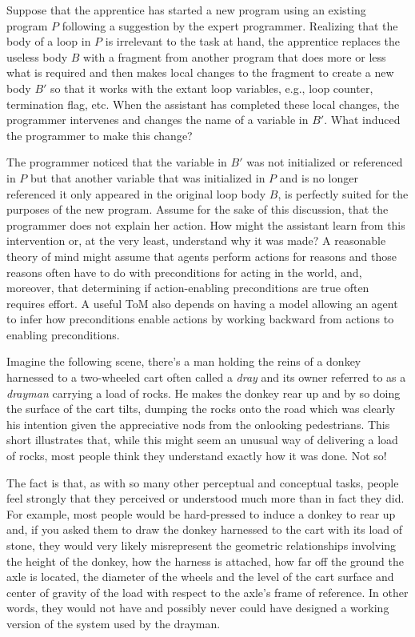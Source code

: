 Suppose that the apprentice has started a new program using an existing program $P$ following a suggestion by the expert programmer. Realizing that the body of a loop in $P$ is irrelevant to the task at hand, the apprentice replaces the useless body $B$ with a fragment from another program that does more or less what is required and then makes local changes to the fragment to create a new body $B'$ so that it works with the extant loop variables, e.g., loop counter, termination flag, etc. When the assistant has completed these local changes, the programmer intervenes and changes the name of a variable in $B'$. What induced the programmer to make this change?

The programmer noticed that the variable in $B'$ was not initialized or referenced in $P$ but that another variable that was initialized in $P$ and is no longer referenced \emdash{} it only appeared in the original loop body $B$, is perfectly suited for the purposes of the new program. Assume for the sake of this discussion, that the programmer does not explain her action. How might the assistant learn from this intervention or, at the very least, understand why it was made? A reasonable theory of mind might assume that agents perform actions for reasons and those reasons often have to do with preconditions for acting in the world, and, moreover, that determining if action-enabling preconditions are true often requires effort. A useful ToM also depends on having a model allowing an agent to infer how preconditions enable actions by working backward from actions to enabling preconditions. 


Imagine the following scene, there's a man holding the reins of a donkey harnessed to a two-wheeled cart \emdash{} often called a {\it{dray}} and its owner referred to as a {\it{drayman}} \emdash{} carrying a load of rocks. He makes the donkey rear up and by so doing the surface of the cart tilts, dumping the rocks onto the road which was clearly his intention given the appreciative nods from the onlooking pedestrians. This short {} illustrates that, while this might seem an unusual way of delivering a load of rocks, most people think they understand exactly how it was done. Not so!

The fact is that, as with so many other perceptual and conceptual tasks, people feel strongly that they perceived or understood much more than in fact they did. For example, most people would be hard-pressed to induce a donkey to rear up and, if you asked them to draw the donkey harnessed to the cart with its load of stone, they would very likely misrepresent the geometric relationships involving the height of the donkey, how the harness is attached, how far off the ground the axle is located, the diameter of the wheels and the level of the cart surface and center of gravity of the load with respect to the axle's frame of reference. In other words, they would not have \emdash{} and possibly never could have \emdash{} designed a working version of the system used by the drayman.

